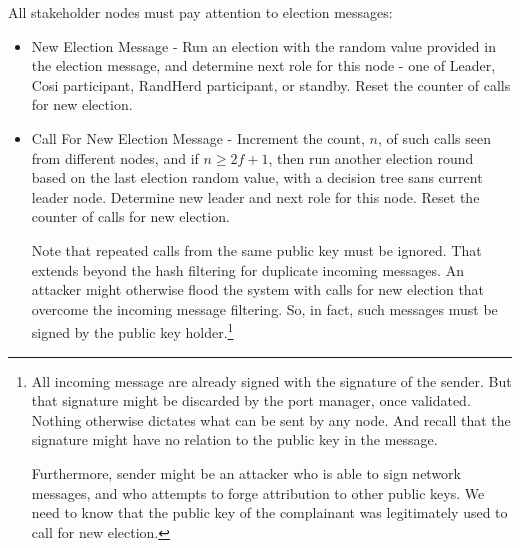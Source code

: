 \documentclass{yellowpaper}
\begin{document}
All stakeholder nodes must pay attention to election messages:
\begin{itemize}
\item New Election Message - Run an election with the random value provided in the election message, and determine next role for this node - one of Leader, Cosi participant, RandHerd participant, or standby. Reset the counter of calls for new election.

\item Call For New Election Message - Increment the count, $n$,  of such calls seen from different nodes, and if $n \ge 2 f +1$, then run another election round based on the last election random value, with a decision tree sans current leader node. Determine new leader and next role for this node.  Reset the counter of calls for new  election.

Note that repeated calls from the same public key must be ignored. That extends beyond the hash filtering for duplicate incoming messages.  An attacker might otherwise flood the system with calls for new election that overcome the incoming message filtering. So, in fact, such messages must be signed by the public key holder.\footnote{All incoming message are already signed with the signature of the sender. But that signature might be discarded by the port manager, once validated. Nothing otherwise dictates what can be sent by any node.  And recall that the signature might have no relation to the public key in the message.

Furthermore, sender might be an attacker who is able to sign network messages, and who attempts to forge attribution to other public keys. 
We need to know that the public key of the complainant was legitimately used to call for new election.}
\end{itemize}
\end{document}
